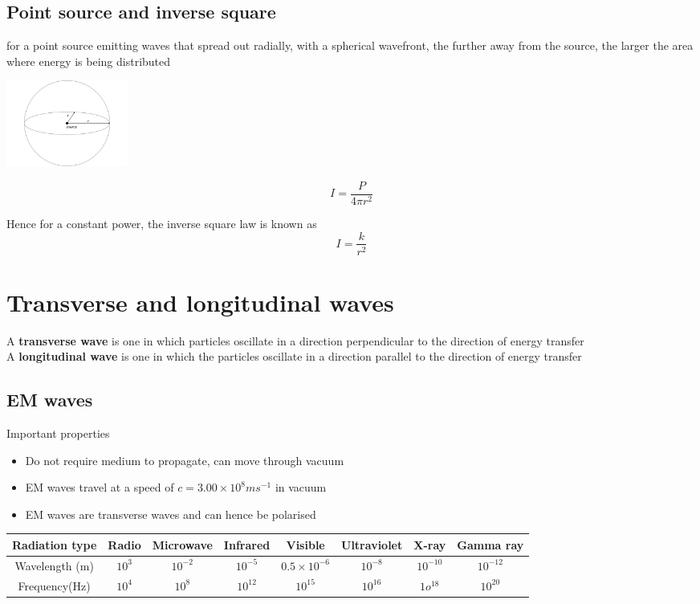 \documentclass[a4paper, 10pt]{article}
\begin{document}
\subsection{Point source and inverse square}
for a point source emitting waves that spread out radially, with a spherical wavefront, the further away from the source, the larger the area where energy is being distributed \\
\begin{minipage}{0.5\textwidth}
\includegraphics[trim = 50 50 50 50, width=4cm]{figures/5.pdf} 
\end{minipage}	
\begin{minipage}{0.5\textwidth}
\[
I = \frac{P}{4\pi r^2}
\]

Hence for a constant power, the inverse square law is known as 
\[
I = \frac{k}{r^2}
\]
\end{minipage}	

\section{Transverse and longitudinal waves}
\begin{framed}
   A \textbf{transverse wave} is one in which particles oscillate in a direction perpendicular to the direction of energy transfer \\

   A \textbf{longitudinal wave} is one in which the particles oscillate in a direction parallel to the direction of energy transfer
\end{framed}	

\subsection{EM waves}
Important properties
\begin{itemize}
   \item Do not require medium to propagate, can move through vacuum
   \item EM waves travel at a speed of $c = 3.00 \times 10^8 ms^{-1}$ in vacuum
   \item EM waves are transverse waves and can hence be polarised
\end{itemize}	
\begin{center}
   \begin{tabular}{c | c | c | c | c | c | c | c}
      Radiation type & Radio & Microwave & Infrared & Visible & Ultraviolet & X-ray & Gamma ray \\
      \hline
      Wavelength (m) & $10^3$ & $10^{-2}$ & $10^{-5}$ & $0.5 \times 10^{-6}$ & $10^{-8}$ & $10^{-10}$ & $10^{-12}$  \\
      Frequency(Hz) & $10^4$  & $10^8$ & $10^{12}$ & $10^{15}$ & $10^{16}$ & $1o^{18}$ & $10^{20}$ 

   \end{tabular}
\end{center}
\end{document}
